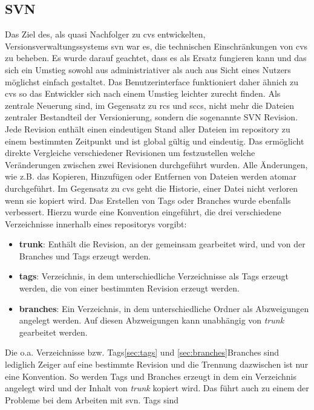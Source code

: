 \subsection{SVN}\label{sec:svn}
Das Ziel des, als quasi Nachfolger zu \acrshort{cvs} entwickelten,
Versionsverwaltungssystems \acrfull{svn} war es, die technischen
Einschränkungen von \acrshort{cvs} zu beheben. Es wurde darauf geachtet, dass
es als Ersatz fungieren kann und das sich ein Umstieg sowohl aus
administriativer als auch aus Sicht eines Nutzers möglichst einfach gestaltet.
Das Benutzerinterface funktioniert daher ähnich zu \acrshort{cvs} so das
Entwickler sich nach einem Umstieg leichter zurecht finden. Als zentrale
Neuerung sind, im Gegensatz zu \acrshort{rcs} und \acrshort{sccs}, nicht mehr
die Dateien zentraler Bestandteil der Versionierung, sondern die sogenannte SVN
Revision. Jede Revision enthält einen eindeutigen Stand aller Dateien im
\gls{repository} zu einem bestimmten Zeitpunkt und ist global gültig und
eindeutig. Das ermöglicht direkte Vergleiche verschiedener Revisionen um
festzustellen welche Veränderungen zwischen zwei Revisionen durchgeführt
wurden. Alle Änderungen, wie z.B. das Kopieren, Hinzufügen oder Entfernen von
Dateien werden atomar durchgeführt. Im Gegensatz zu \acrshort{cvs} geht die
Historie, einer Datei nicht verloren wenn sie kopiert wird. Das Erstellen von
Tags oder Branches wurde ebenfalls verbessert. Hierzu wurde eine Konvention
eingeführt, die drei verschiedene Verzeichnisse innerhalb eines
\glspl{repository} vorgibt:
\begin{itemize}
\item \textbf{trunk}: Enthält die Revision, an der gemeinsam gearbeitet wird,
       und von der Branches und Tags erzeugt werden.
\item \textbf{tags}: Verzeichnis, in dem unterschiedliche Verzeichnisse als
       Tags erzeugt werden, die von einer bestimmten Revision erzeugt werden.
\item \textbf{branches}: Ein Verzeichnis, in dem unterschiedliche Ordner als
      Abzweigungen angelegt werden. Auf diesen Abzweigungen kann unabhängig von
      \textit{trunk} gearbeitet werden.
\end{itemize}
Die o.a. Verzeichnisse bzw. Tags\ref{sec:tags} und \ref{sec:branches}Branches
sind lediglich Zeiger auf eine bestimmte Revision und die Trennung dazwischen
ist nur eine Konvention. So werden Tags und Branches erzeugt in dem ein
Verzeichnis angelegt wird und der Inhalt von \textit{trunk} kopiert wird. Das
führt auch zu einem der Probleme bei dem Arbeiten mit \acrlong{svn}. Tags sind
